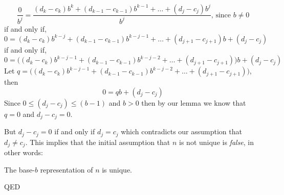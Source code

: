 \documentclass{article}
\begin{document}
\[\frac{0}{b^j}=\frac{(d_k-c_k)b^k+(d_{k-1}-c_{k-1})b^{k-1}+\dots+(d_j-c_j)b^j}{b^j}\text{, since }b\ne0\]
if and only if,
\[0=(d_k-c_k)b^{k-j}+(d_{k-1}-c_{k-1})b^{k-j-1}+\dots+(d_{j+1}-c_{j+1})b+(d_j-c_j)\]
if and only if,
\[0=\big((d_k-c_k)b^{k-j-1}+(d_{k-1}-c_{k-1})b^{k-j-2}+\dots+(d_{j+1}-c_{j+1})\big)b+(d_j-c_j)\]
Let $q=\big((d_k-c_k)b^{k-j-1}+(d_{k-1}-c_{k-1})b^{k-j-2}+\dots+(d_{j+1}-c_{j+1})\big)$, then
\[0=qb+(d_j-c_j)\]
Since $0\le(d_j-c_j)\le(b-1)$ and $b>0$ then by our lemma we know that\\
$q=0$ and $d_j-c_j = 0$.

But $d_j-c_j = 0$ if and only if $d_j = c_j$
which contradicts our assumption that $d_j\ne{}c_j$. This implies that the initial assumption that $n$
is not unique is \emph{false}, in other words:

The base-$b$ representation of $n$ is unique.

QED
\end{document}
